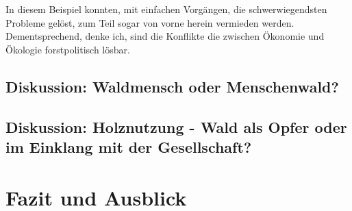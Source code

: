 \documentclass[12pt]{article}
\begin{document}
In diesem Beispiel konnten, mit einfachen Vorgängen, die schwerwiegendsten Probleme gelöst, zum Teil sogar 
von vorne herein vermieden werden. Dementsprechend, denke ich, sind die Konflikte die zwischen Ökonomie 
und Ökologie forstpolitisch lösbar. 


\subsection*{Diskussion: Waldmensch oder Menschenwald?}
\subsection*{Diskussion: Holznutzung - Wald als Opfer oder im Einklang mit der Gesellschaft?}

\section*{Fazit und Ausblick}
\end{document}
